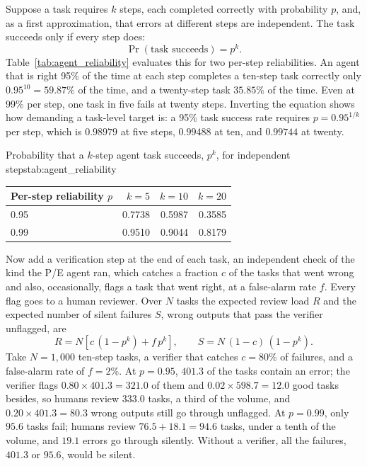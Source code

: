 \documentclass[../ai_in_finance]{subfiles}
\begin{document}
Suppose a task requires $k$ steps, each completed correctly with probability $p$, and, as a first approximation, that errors at different steps are independent. The task succeeds only if every step does:
\begin{equation}
\Pr(\text{task succeeds}) = p^{k}.
\label{eq:nlp-agent-success}
\end{equation}
Table~\ref{tab:agent_reliability} evaluates this for two per-step reliabilities. An agent that is right 95\% of the time at each step completes a ten-step task correctly only $0.95^{10} = 59.87\%$ of the time, and a twenty-step task $35.85\%$ of the time. Even at 99\% per step, one task in five fails at twenty steps. Inverting the equation shows how demanding a task-level target is: a 95\% task success rate requires $p = 0.95^{1/k}$ per step, which is $0.98979$ at five steps, $0.99488$ at ten, and $0.99744$ at twenty.

\begin{booktable}[htbp]{Probability that a $k$-step agent task succeeds, $p^k$, for independent steps}{tab:agent_reliability}
\begin{tabular}{lrrr}
\toprule
Per-step reliability $p$ & $k=5$ & $k=10$ & $k=20$ \\
\midrule
0.95 & 0.7738 & 0.5987 & 0.3585 \\
0.99 & 0.9510 & 0.9044 & 0.8179 \\
\bottomrule
\end{tabular}
\end{booktable}

Now add a verification step at the end of each task, an independent check of the kind the P/E agent ran, which catches a fraction $c$ of the tasks that went wrong and also, occasionally, flags a task that went right, at a false-alarm rate $f$. Every flag goes to a human reviewer. Over $N$ tasks the expected review load $R$ and the expected number of silent failures $S$, wrong outputs that pass the verifier unflagged, are
\begin{equation}
R = N\left[c\,(1-p^{k}) + f\,p^{k}\right], \qquad S = N\,(1-c)\,(1-p^{k}).
\label{eq:nlp-agent-review}
\end{equation}
Take $N = 1{,}000$ ten-step tasks, a verifier that catches $c = 80\%$ of failures, and a false-alarm rate of $f = 2\%$. At $p = 0.95$, $401.3$ of the tasks contain an error; the verifier flags $0.80 \times 401.3 = 321.0$ of them and $0.02 \times 598.7 = 12.0$ good tasks besides, so humans review $333.0$ tasks, a third of the volume, and $0.20 \times 401.3 = 80.3$ wrong outputs still go through unflagged. At $p = 0.99$, only $95.6$ tasks fail; humans review $76.5 + 18.1 = 94.6$ tasks, under a tenth of the volume, and $19.1$ errors go through silently. Without a verifier, all the failures, $401.3$ or $95.6$, would be silent.
\end{document}
